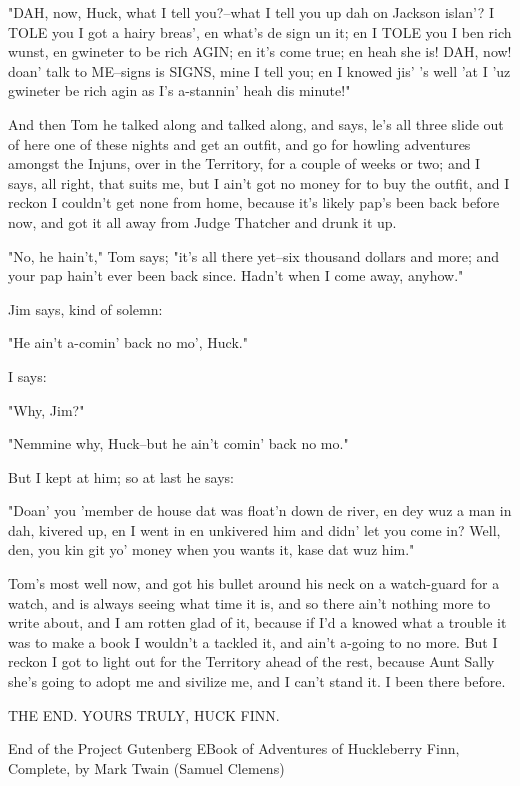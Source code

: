 "DAH, now, Huck, what I tell you?--what I tell you up dah on Jackson
islan'?  I TOLE you I got a hairy breas', en what's de sign un it; en I
TOLE you I ben rich wunst, en gwineter to be rich AGIN; en it's come
true; en heah she is!  DAH, now! doan' talk to ME--signs is SIGNS, mine I
tell you; en I knowed jis' 's well 'at I 'uz gwineter be rich agin as I's
a-stannin' heah dis minute!"

And then Tom he talked along and talked along, and says, le's all three
slide out of here one of these nights and get an outfit, and go for
howling adventures amongst the Injuns, over in the Territory, for a
couple of weeks or two; and I says, all right, that suits me, but I ain't
got no money for to buy the outfit, and I reckon I couldn't get none from
home, because it's likely pap's been back before now, and got it all away
from Judge Thatcher and drunk it up.

"No, he hain't," Tom says; "it's all there yet--six thousand dollars and
more; and your pap hain't ever been back since.  Hadn't when I come away,
anyhow."

Jim says, kind of solemn:

"He ain't a-comin' back no mo', Huck."

I says:

"Why, Jim?"

"Nemmine why, Huck--but he ain't comin' back no mo."

But I kept at him; so at last he says:

"Doan' you 'member de house dat was float'n down de river, en dey wuz a
man in dah, kivered up, en I went in en unkivered him and didn' let you
come in?  Well, den, you kin git yo' money when you wants it, kase dat
wuz him."

Tom's most well now, and got his bullet around his neck on a watch-guard
for a watch, and is always seeing what time it is, and so there ain't
nothing more to write about, and I am rotten glad of it, because if I'd a
knowed what a trouble it was to make a book I wouldn't a tackled it, and
ain't a-going to no more.  But I reckon I got to light out for the
Territory ahead of the rest, because Aunt Sally she's going to adopt me
and sivilize me, and I can't stand it.  I been there before.

THE END. YOURS TRULY, HUCK FINN.




End of the Project Gutenberg EBook of Adventures of Huckleberry Finn,
Complete, by Mark Twain (Samuel Clemens)

